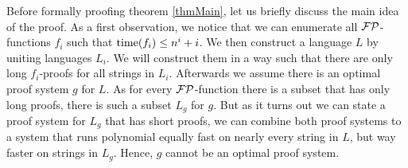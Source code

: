   Before formally proofing theorem \ref{thmMain}, let us briefly discuss the main idea of the proof. As a first observation, we notice that we can enumerate all \(\mathcal{FP}\)-functions \(f_i\) such that \(\operatorname{time}(f_i) \leq n^i + i\). We then construct a language \(L\) by uniting languages \(L_i\). We will construct them in a way such that there are only long \(f_i\)-proofs for all strings in \(L_i\). Afterwards we assume there is an optimal proof system \(g\) for \(L\). As for every \(\mathcal{FP}\)-function there is a subset that has only long proofs, there is such a subset \(L_g\) for \(g\). But as it turns out we can state a proof system for \(L_g\) that has short proofs, we can combine both proof systems to a system that runs polynomial equally fast on nearly every string in \(L\), but way faster on strings in \(L_g\). Hence, \(g\) cannot be an optimal proof system.
  
